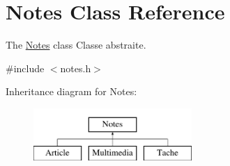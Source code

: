 \hypertarget{class_notes}{}\section{Notes Class Reference}
\label{class_notes}


The \hyperlink{class_notes}{Notes} class Classe abstraite.  




{\ttfamily \#include $<$notes.\+h$>$}

Inheritance diagram for Notes\+:\begin{figure}[H]
\begin{center}
\leavevmode
\includegraphics[height=2.000000cm]{class_notes}
\end{center}
\end{figure}
